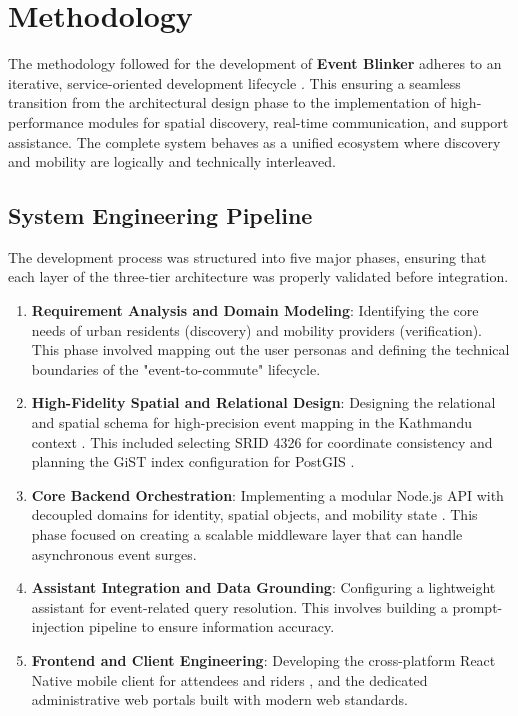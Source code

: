\chapter{Methodology}
The methodology followed for the development of \textbf{Event Blinker} adheres to an iterative, service-oriented development lifecycle \cite{reactnative}. This ensuring a seamless transition from the architectural design phase to the implementation of high-performance modules for spatial discovery, real-time communication, and support assistance. The complete system behaves as a unified ecosystem where discovery and mobility are logically and technically interleaved.

\section{System Engineering Pipeline}
The development process was structured into five major phases, ensuring that each layer of the three-tier architecture was properly validated before integration.

\begin{enumerate}
    \item \textbf{Requirement Analysis and Domain Modeling}: Identifying the core needs of urban residents (discovery) and mobility providers (verification). This phase involved mapping out the user personas and defining the technical boundaries of the "event-to-commute" lifecycle.
    \item \textbf{High-Fidelity Spatial and Relational Design}: Designing the relational and spatial schema for high-precision event mapping in the Kathmandu context \cite{postgis}. This included selecting SRID 4326 for coordinate consistency and planning the GiST index configuration for PostGIS \cite{gist}.
    \item \textbf{Core Backend Orchestration}: Implementing a modular Node.js API with decoupled domains for identity, spatial objects, and mobility state \cite{nodejs}. This phase focused on creating a scalable middleware layer that can handle asynchronous event surges.
    \item \textbf{Assistant Integration and Data Grounding}: Configuring a lightweight assistant for event-related query resolution. This involves building a prompt-injection pipeline to ensure information accuracy.
    \item \textbf{Frontend and Client Engineering}: Developing the cross-platform React Native mobile client for attendees and riders \cite{reactnative}, and the dedicated administrative web portals built with modern web standards.
\end{enumerate}

